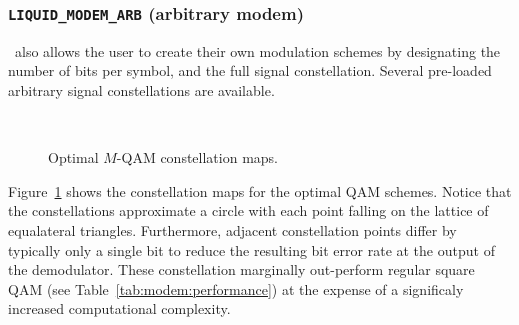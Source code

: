 \subsubsection{{\tt LIQUID\_MODEM\_ARB} (arbitrary modem)}
\label{module:modem:digital:ARB}
\liquid\ also allows the user to create their own modulation schemes by
designating the number of bits per symbol, and the full signal constellation.
Several pre-loaded arbitrary signal constellations are available.
%
\begin{figure}
\centering
\mbox{
   \quad
   \quad
}
\mbox{
   \quad
   \quad
}
   \quad
\caption{Optimal $M$-QAM constellation maps.}
\label{fig:modem:optqam}
\end{figure}
%
Figure~\ref{fig:modem:optqam} shows the constellation maps for the
optimal QAM schemes.
Notice that the constellations approximate a circle with each point
falling on the lattice of equalateral triangles.
Furthermore, adjacent constellation points differ by typically only a
single bit to reduce the resulting bit error rate at the output of the
demodulator.
These constellation marginally out-perform regular square QAM
(see Table~\ref{tab:modem:performance}) at the expense of a significaly
increased computational complexity.

